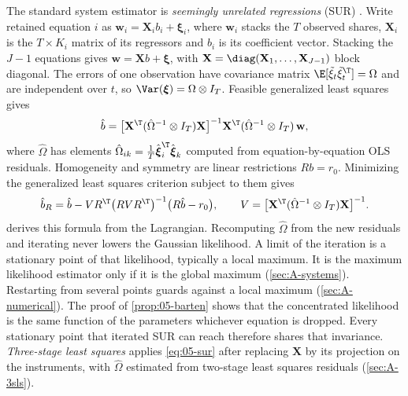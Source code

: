 The standard system estimator is \emph{seemingly unrelated regressions} (SUR) \citep{Zellner1962}. Write
retained equation $i$ as $\mathbf{w}_i = \mathbf{X}_ib_i + \boldsymbol{\xi}_i$, where $\mathbf{w}_i$ stacks
the $T$ observed shares, $\mathbf{X}_i$ is the $T \times K_i$ matrix of its regressors and $b_i$ is its
coefficient vector. Stacking the $J - 1$ equations gives $\mathbf{w} = \mathbf{X}b + \boldsymbol{\xi}$, with
$\mathbf{X} = \diag(\mathbf{X}_1, \dots, \mathbf{X}_{J-1})$ block diagonal. The errors of one observation
have covariance matrix $\E[\tilde\xi_t\tilde\xi_t^{\T}] = \Omega$ and are independent over $t$, so
$\Var(\boldsymbol{\xi}) = \Omega\otimes I_T$. Feasible generalized least squares gives
\begin{equation}\label{eq:05-sur}
  \hat b = \bigl[\mathbf{X}^{\T}(\hat\Omega^{-1}\otimes I_T)\mathbf{X}\bigr]^{-1}
           \mathbf{X}^{\T}(\hat\Omega^{-1}\otimes I_T)\,\mathbf{w},
\end{equation}
where $\hat\Omega$ has elements $\hat\Omega_{ik} = \frac{1}{T}\hat{\boldsymbol{\xi}}_i^{\T}\hat{\boldsymbol{\xi}}_k$
computed from equation-by-equation OLS residuals. Homogeneity and symmetry are linear restrictions
$Rb = r_0$. Minimizing the generalized least squares criterion subject to them gives
\begin{equation}\label{eq:05-sur-restricted}
  \hat b_R = \hat b - VR^{\T}\bigl(RVR^{\T}\bigr)^{-1}\bigl(R\hat b - r_0\bigr), \qquad
  V = \bigl[\mathbf{X}^{\T}(\hat\Omega^{-1}\otimes I_T)\mathbf{X}\bigr]^{-1}.
\end{equation}
 derives this formula from the Lagrangian. Recomputing $\hat\Omega$ from the new residuals
and iterating never lowers the Gaussian likelihood. A limit of the iteration is a stationary point of that
likelihood, typically a local maximum. It is the maximum likelihood estimator only if it is the global maximum
(\cref{sec:A-systems}). Restarting from several points guards against a local maximum (\cref{sec:A-numerical}).
The proof of \cref{prop:05-barten} shows that the concentrated likelihood is the same function of the parameters
whichever equation is dropped. Every stationary point that iterated SUR can reach therefore shares that
invariance. \emph{Three-stage least squares} applies \eqref{eq:05-sur} after
replacing $\mathbf{X}$ by its projection on the instruments, with $\hat\Omega$ estimated from two-stage least
squares residuals (\cref{sec:A-3sls}).

